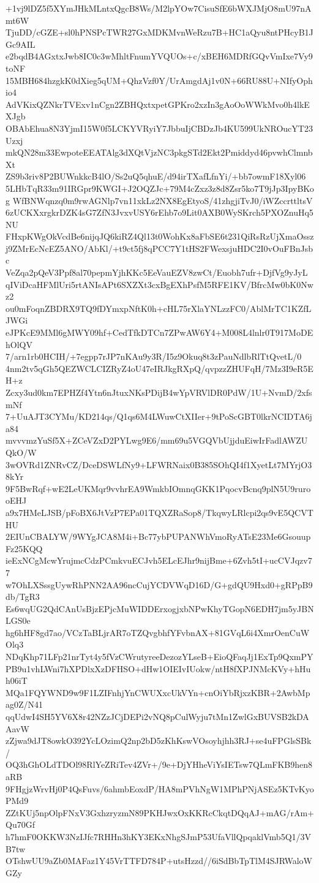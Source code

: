 +1vj9lDZ5f5XYmJHkMLntxQgcB8Ws/M2lpYOw7CisuSfE6bWXJMjO8mU97nAmt6W
TjuDD/cGZE+sl0hPNSPcTWR27GxMDKMvnWeRzu7B+HC1aQyu8ntPHcyB1JGc9AIL
e2bqdB4AGxtxJwb8IC0c3wMhltFnumYVQUOs+c/xBEH6MDRfGQvVmIxe7Vy9toNF
15MBH684hzgkK0dXieg5qUM+QhzVzf0Y/UrAmgdAj1v0N+66RU88U+NIfyOphio4
AdVKixQZNkrTVExv1nCgn2ZBHQxtxpetGPKro2xzIn3gAoOoWWkMvo0h4lkEXJgb
OBAbEhua8N3YjmI15W0f5LCKYVRyiY7JbbuIjCBDzJb4KU599UkNROucYT23Uzxj
mkQN28m33EwpoteEEATAlg3dXQtVjzNC3pkgSTd2Ekt2Pmiddyd46pvwhClmnbXt
ZS9b3riv8P2BUWnkkcB4lO/Ss2uQ5qhuE/d94irTXafLfnYi/+bb7owmF18Xyl06
5LHbTqR33m91IRGpr9KWGI+J2OQZJc+79M4cZxz3z8d8Zsr5ko7T9jJp3IpyBKog
WfBNWqnzq0m9rwAGNlp7vn11xkLz2NX8EgEtyoS/41zhgjiTvJ0/iWZccrttltsV
6zUCKXxrgkrDZK4sG7ZfN3JvxvUSY6rEhb7o9Lit0AXB0WySKrch5PXOZnuHq5NU
FHxpKWgOkVcdBe6nijqJQ6kiRZ4Ql13t0WohKx8aFbSE6t231QiRsRzUjXmaOssz
j9ZMrEcNcEZ5ANO/AbKl/+t9ct5fj8qPCC7Y1tHS2FWexsjuHDC2I0vOuFBnJsbc
VeZqa2pQeV3Ppf8al70pepmYjhKKc5EeVauEZV8zwCt/Euobh7ufr+DjfVg9yJyL
qIViDcaHFMlUri5rtANIsAPt6SXZXt3cxBgEXhPsfM5RFE1KV/BfrcMw0bK0Nwz2
ou0mFoqnZBDRX9TQ9fDYmxpNftK0h+cHL75rXlaYNLzzFC0/AblMrTC1KZfLJWGi
eJPKcE9MMl6gMWY09hf+CedTfkDTCn7ZPwAW6Y4+M008L4lnlr0T917MoDEhOlQV
7/arn1rb0HCIH/+7egpp7rJP7nKAu9y3R/I5z9Okuq8t3zPauNdlbRlTtQvetL/0
4nm2tv5qGh5QEZWCLCIZRyZ4oU47eIRJkgRXpQ/qvpzzZHUFqH/7Mz3I9eR5EH+z
Zcxy3ud0km7EPHZf4Ytn6nJtuxNKsPDijB4wYpVRVlDR0PdW/1U+NvmD/2xfsmNf
7+UuAJT3CYMu/KD214qs/Q1qs6M4LWuwCtXIIer+9tPoScGBT0lkrNCIDTA6ja84
mvvvmzYuSf5X+ZCeVZxD2PYLwg9E6/mm69u5VGQVbUjjduEiwIrFadlAWZUQkO/W
3wOVRd1ZNRvCZ/DceDSWLfNy9+LFWRNaix0B385SOhQI4f1XyetLt7MYrjO38kYr
9F5BwRqf+wE2LeUKMqr9vvhrEA9WmkbIOmnqGKK1PqocvBcnq9plN5U9rurooEHJ
a9x7HMeLJSB/pFoBX6JtVzP7EPa01TQXZRaSop8/TkqwyLRlcpi2qs9vE5QCVTHU
2EIUnCBALYW/9WYgJCA8M4i+Bc77ybPUPANWhVmoRyATsE23Me6GsouupFz25KQQ
ieExNCgMcwYrujmcCdzPCmkvuECJvh5ELcEJhr9nijBme+6Zvh5tI+ucCVJqzv77
w7OhLXSssgUywRhPNN2AA96ncCujYCDVWqD16D/G+gdQU9Hxd0+gRPpB9db/TgR3
Es6wqUG2QdCAnUsBjzEPjcMuWIDDErxogjxbNPwKhyTGopN6EDH7jm5yJBNLGS0e
hg6hHF8gd7ao/VCzTaBLjrAR7oTZQvgbhfYFvbnAX+81GVqL6i4XmrOenCuWOlq3
NDqKhp71LFp21nrTyt4y5fVzCWrutyreeDezozYLseB+EioQFaqJj1ExTp9QxmPY
PB9u1vhLWni7hXPDlxXzDFHSO+dHw1OIEIvIUokw/ntH8fXPJNMcKVy+hHuh06iT
MQa1FQYWND9w9F1LZIFnhjYnCWUXxcUkVYn+cnOiYbRjxzKBR+2AwbMpag0Z/N41
qqUdwI4SH5YV6X8r42NZzJCjDEPi2vNQ8pCulWyju7tMn1ZwlGxBUVSB2kDAAavW
zZjwa9dJT8owkO392YcLOzimQ2np2bD5zKhKswVOsoyhjhh3RJ+se4uFPGlsSBk/
OQ3hGhOLdTDOl98RlYeZRiTev4ZVr+/9e+DjYHheViYsIETsw7QLmFKB9hen8aRB
9FHgjzWrvHj0P4QsFuvs/6ahmbEoxdP/HA8mPVhNgW1MPhPNjASEz5KTvKyoPMd9
ZZtKUj5npOlpFNxV3GxhzryzmN89PKHJwxOxKKRcCkqtDQqAJ+mAG/rAm+Qu70Gf
h7hmF0OKKW3NzIJfc7RHHn3hKY3EKxNhgSJmP53UfaVllQpqaklVmb5Q1/3VB7tw
OTshwUU9aZb0MAFaz1Y45VrTTFD784P+utsHzzd//6iSdBbTpTlM4SJRWaloWGZy
